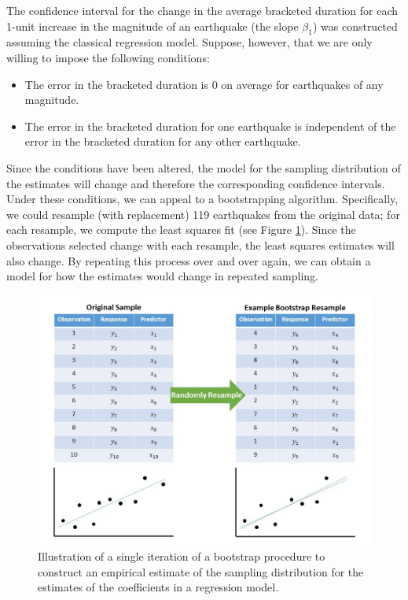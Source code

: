 \documentclass[
]{book}
\providecommand{\tightlist}{%
  \setlength{\itemsep}{0pt}\setlength{\parskip}{0pt}}
\theoremstyle{plain}
\theoremstyle{mydefn}
\theoremstyle{myexmpl}
\theoremstyle{remark}
\begin{document}
The confidence interval for the change in the average bracketed duration for each 1-unit increase in the magnitude of an earthquake (the slope \(\beta_1\)) was constructed assuming the classical regression model. Suppose, however, that we are only willing to impose the following conditions:

\begin{itemize}
\tightlist
\item
  The error in the bracketed duration is 0 on average for earthquakes of any magnitude.
\item
  The error in the bracketed duration for one earthquake is independent of the error in the bracketed duration for any other earthquake.
\end{itemize}

Since the conditions have been altered, the model for the sampling distribution of the estimates will change and therefore the corresponding confidence intervals. Under these conditions, we can appeal to a bootstrapping algorithm. Specifically, we could resample (with replacement) 119 earthquakes from the original data; for each resample, we compute the least squares fit (see Figure \ref{fig:regconditions-bootstrap}). Since the observations selected change with each resample, the least squares estimates will also change. By repeating this process over and over again, we can obtain a model for how the estimates would change in repeated sampling.

\begin{figure}

{\centering \includegraphics[width=0.8\linewidth]{./images/RegConditions-Bootstrap} 

}

\caption{Illustration of a single iteration of a bootstrap procedure to construct an empirical estimate of the sampling distribution for the estimates of the coefficients in a regression model.}\label{fig:regconditions-bootstrap}
\end{figure}
\end{document}
